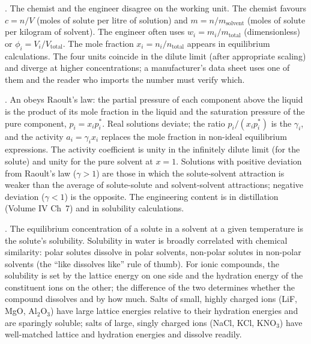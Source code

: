 . The chemist and the engineer disagree
on the working unit. The chemist favours  $c =
n/V$ (moles of solute per litre of solution) and  $m
= n/m_{\text{solvent}}$ (moles of solute per kilogram of solvent). The
engineer often uses  $w_i = m_i/m_{\text{total}}$
(dimensionless) or  $\phi_i = V_i/
V_{\text{total}}$. The mole fraction $x_i = n_i/n_{\text{total}}$
appears in equilibrium calculations. The four units coincide
in the dilute limit (after appropriate scaling) and diverge at higher
concentrations; a manufacturer's data sheet uses one of them and the
reader who imports the number must verify which.

. An 
obeys Raoult's law: the partial pressure of each component above the
liquid is the product of its mole fraction in the liquid and the
saturation pressure of the pure component, $p_i = x_i p_i^*$.
Real solutions deviate; the ratio $p_i/(x_i p_i^*)$ is the
 $\gamma_i$, and the activity
$a_i = \gamma_i x_i$ replaces the mole fraction in non-ideal
equilibrium expressions. The activity coefficient is unity in the
infinitely dilute limit (for the solute) and unity for the pure
solvent at $x = 1$. Solutions with positive deviation from Raoult's
law ($\gamma > 1$) are those in which the solute-solvent attraction is
weaker than the average of solute-solute and solvent-solvent
attractions; negative deviation ($\gamma < 1$) is the opposite. The
engineering content is in distillation (Volume IV Ch~7) and in
solubility calculations.

. The equilibrium concentration of a solute in a
solvent at a given temperature is the solute's solubility. Solubility
in water is broadly correlated with chemical similarity: polar solutes
dissolve in polar solvents, non-polar solutes in non-polar solvents
(the ``like dissolves like'' rule of thumb). For ionic compounds, the
solubility is set by the lattice energy on one side and the
hydration energy of the constituent ions on the other; the difference
of the two determines whether the compound dissolves and by how much.
Salts of small, highly charged ions (LiF, MgO, Al$_2$O$_3$) have
large lattice energies relative to their hydration energies and are
sparingly soluble; salts of large, singly charged ions (NaCl, KCl,
KNO$_3$) have well-matched lattice and hydration energies and dissolve
readily.

